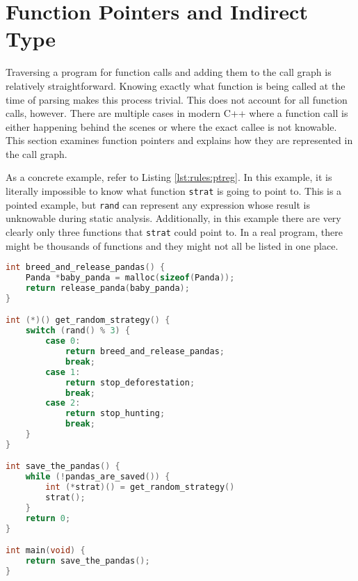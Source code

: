 \section{Function Pointers and Indirect Type}\label{sec:rules:funptrs}

Traversing a program for function calls and adding them to the call graph is relatively straightforward.  Knowing exactly what function is being called at the time of parsing makes this process trivial.  This does not account for all function calls, however.  There are multiple cases in modern C++ where a function call is either happening behind the scenes or where the exact callee is not knowable.  This section examines function pointers and explains how they are represented in the call graph.  

As a concrete example, refer to Listing \ref{lst:rules:ptreg}.  In this example, it is literally impossible to know what function \lstinline{strat} is going to point to.  This is a pointed example, but \lstinline{rand} can represent any expression whose result is unknowable during static analysis.  Additionally, in this example there are very clearly only three functions that \lstinline{strat} could point to.  In a real program, there might be thousands of functions and they might not all be listed in one place.  

\noindent\begin{minipage}[t]{\linewidth}
\begin{lstlisting}[language=C,caption={In this example C program, it is impossible to know statically what the value of \lstinline{strat} is.  Because of this, funqual requires the programmer to annotate function pointers with additional type information. },label={lst:rules:ptreg}]
int breed_and_release_pandas() {
    Panda *baby_panda = malloc(sizeof(Panda));
    return release_panda(baby_panda);
}

int (*)() get_random_strategy() {
    switch (rand() % 3) {
        case 0:
            return breed_and_release_pandas;
            break;
        case 1:
            return stop_deforestation;
            break;
        case 2:
            return stop_hunting;
            break;
    }
}

int save_the_pandas() {
    while (!pandas_are_saved()) {
        int (*strat)() = get_random_strategy()
        strat();
    }
    return 0;
}

int main(void) {
    return save_the_pandas();
}
\end{lstlisting}
\end{minipage}

